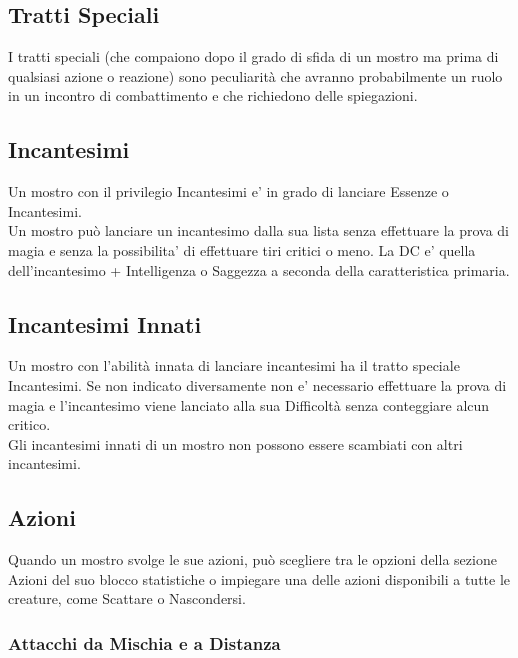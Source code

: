 \begin{multicols}{2}
\subsection{Tratti Speciali}

I tratti speciali (che compaiono dopo il grado di sfida di un mostro ma prima di qualsiasi azione o reazione) sono peculiarità che avranno probabilmente un ruolo in un incontro di combattimento e che richiedono delle spiegazioni.

\subsection{Incantesimi}

Un mostro con il privilegio Incantesimi e' in grado di lanciare Essenze o Incantesimi.\\
Un mostro può lanciare un incantesimo dalla sua lista senza effettuare la prova di magia e senza la possibilita' di effettuare tiri critici o meno. La DC e' quella dell'incantesimo + Intelligenza o Saggezza a seconda della caratteristica primaria.

\subsection{Incantesimi Innati}

Un mostro con l'abilità innata di lanciare incantesimi ha il tratto speciale Incantesimi.
Se non indicato diversamente non e' necessario effettuare la prova di magia e l'incantesimo viene lanciato alla sua Difficoltà senza conteggiare alcun critico.\\
Gli incantesimi innati di un mostro non possono essere scambiati con altri incantesimi. 

\subsection{Azioni}

Quando un mostro svolge le sue azioni, può scegliere tra le opzioni della sezione Azioni del suo blocco statistiche o impiegare una delle azioni disponibili a tutte le creature, come Scattare o Nascondersi.

\subsubsection{Attacchi da Mischia e a Distanza}


\end{multicols}
